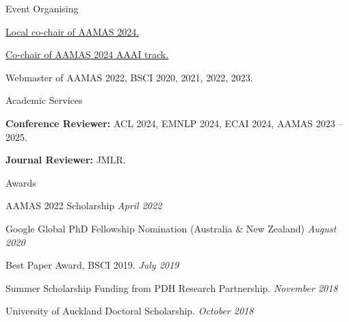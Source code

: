 \documentclass{resume} %
\begin{document}

\begin{rSection}{Event Organising}
	\begin{rSubsection}{}{}{}{}
		\item \href{https://www.aamas2024-conference.auckland.ac.nz/organization/organizing-committee/}{Local co-chair of AAMAS 2024.}
		\item \href{https://www.aamas2024-conference.auckland.ac.nz/organization/organizing-committee/}{Co-chair of AAMAS 2024 AAAI track.}
		\item Webmaster of AAMAS 2022, BSCI 2020, 2021, 2022, 2023.
	\end{rSubsection}
\end{rSection}

\begin{rSection}{Academic Services}
	\begin{rSubsection}{}{}{}{}
		\item {\bf Conference Reviewer:} ACL 2024, EMNLP 2024, ECAI 2024, AAMAS 2023 -- 2025.
		\item {\bf Journal Reviewer:} JMLR.
	\end{rSubsection}
\end{rSection}


\begin{rSection}{Awards}
\begin{rSubsection}{}{}{}{}
\item AAMAS 2022 Scholarship \hfill {\em April 2022}
\item Google Global PhD Fellowship Nomination (Australia \& New Zealand) \hfill {\em August 2020}
\item Best Paper Award, BSCI 2019. \hfill {\em July 2019}
\item Summer Scholarship Funding from PDH Research Partnership. \hfill {\em November 2018}
\item University of Auckland Doctoral Scholarship. \hfill {\em October 2018}
\end{rSubsection}
\end{rSection}
\end{document}
